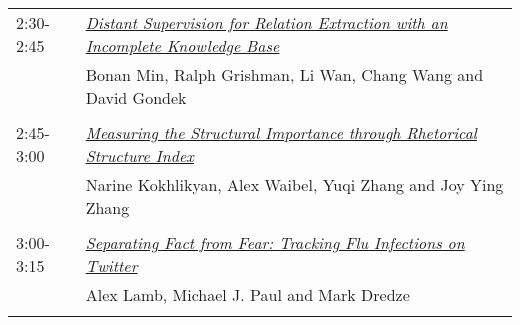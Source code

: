 \begin{tabular}{p{20mm}p{138mm}}
2:30-2:45 & \hyperlink{page.777}{\em Distant Supervision for Relation Extraction with an Incomplete Knowledge Base}\\
         & Bonan Min, Ralph Grishman, Li Wan, Chang Wang and David Gondek \\
\\

2:45-3:00 & \hyperlink{page.783}{\em Measuring the Structural Importance through Rhetorical Structure Index}\\
         & Narine Kokhlikyan, Alex Waibel, Yuqi Zhang and Joy Ying Zhang \\
\\

3:00-3:15 & \hyperlink{page.789}{\em Separating Fact from Fear: Tracking Flu Infections on Twitter}\\
         & Alex Lamb, Michael J. Paul and Mark Dredze \\
\\

\end{tabular}
\newpage
